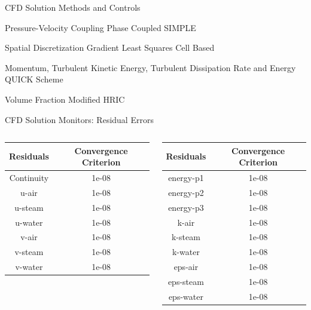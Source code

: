 \begin{frame}{CFD Solution Methods and Controls}
    \begin{block}{Pressure-Velocity Coupling}
    Phase Coupled SIMPLE
    \end{block}
    \begin{block}{Spatial Discretization}
    Gradient Least Squares Cell Based
    \end{block}
    \begin{block}{Momentum, Turbulent Kinetic Energy, Turbulent Dissipation Rate and Energy}
    QUICK Scheme
    \end{block}
    \begin{block}{Volume Fraction}
    Modified HRIC
    \end{block}
\end{frame}

\begin{frame}{CFD Solution Monitors: Residual Errors}
  \begin{columns}
    \begin{table}[h]
        \centering
        \begin{tabular}{cc}
        \hline
            Residuals & Convergence Criterion \\
        \hline
            Continuity & 1e-08\\
            u-air & 1e-08\\
            u-steam & 1e-08\\
            u-water & 1e-08\\
            v-air & 1e-08\\
            v-steam & 1e-08\\
            v-water & 1e-08\\
        \hline
        \end{tabular}
    \end{table}
    \begin{table}[h]
        \centering
        \begin{tabular}{cc}
        \hline
            Residuals & Convergence Criterion \\
        \hline
            energy-p1 & 1e-08\\
            energy-p2 & 1e-08\\
            energy-p3 & 1e-08\\
            k-air & 1e-08\\
            k-steam & 1e-08\\
            k-water & 1e-08\\
            eps-air & 1e-08\\
            eps-steam & 1e-08\\
            eps-water & 1e-08\\
        \hline
        \end{tabular}
    \end{table}
  \end{columns}
\end{frame}